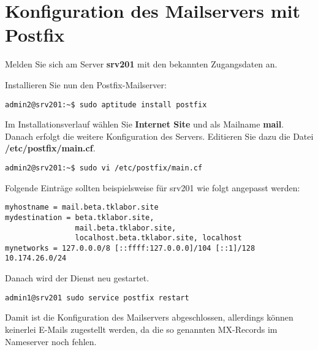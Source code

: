 \section{Konfiguration des Mailservers mit Postfix}

Melden Sie sich am Server \textbf{srv201} mit den bekannten Zugangsdaten an. 

Installieren Sie nun den Postfix-Mailserver:
\begin{lstlisting}
admin2@srv201:~$ sudo aptitude install postfix
\end{lstlisting}
Im Installationsverlauf wählen Sie \textbf{Internet Site} und als Mailname \textbf{mail}. Danach erfolgt die weitere Konfiguration 
des Servers. Editieren Sie dazu die Datei \textbf{/etc/postfix/main.cf}.
\begin{scriptsize}
\begin{lstlisting}
admin2@srv201:~$ sudo vi /etc/postfix/main.cf
\end{lstlisting}
Folgende Einträge sollten beispielsweise für srv201 wie folgt angepasst werden:
\begin{lstlisting}
myhostname = mail.beta.tklabor.site
mydestination = beta.tklabor.site, 
                mail.beta.tklabor.site, 
                localhost.beta.tklabor.site, localhost
mynetworks = 127.0.0.0/8 [::ffff:127.0.0.0]/104 [::1]/128 10.174.26.0/24
\end{lstlisting}
\end{scriptsize}

Danach wird der Dienst neu gestartet.
\begin{lstlisting}
admin1@srv201 sudo service postfix restart
\end{lstlisting}
Damit ist die Konfiguration des Mailservers abgeschlossen, allerdings können keinerlei E-Mails zugestellt werden, da die so genannten MX-Records im Nameserver noch fehlen.

